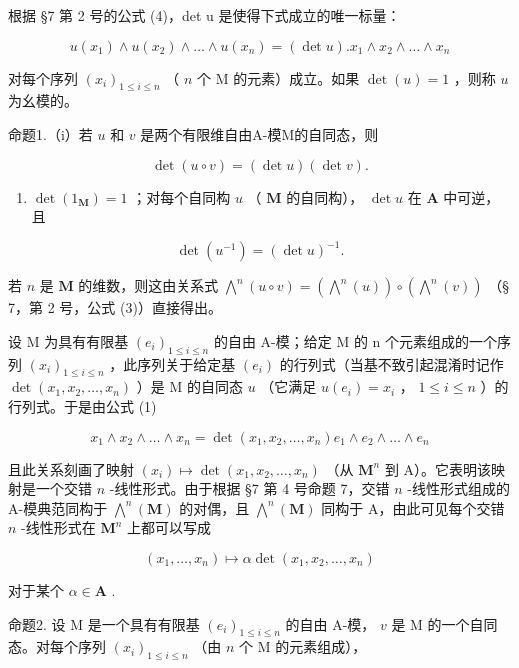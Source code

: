 根据 §7 第 2 号的公式 (4)，det u 是使得下式成立的唯一标量：

\[
u \left(x _ {1}\right) \wedge u \left(x _ {2}\right) \wedge \dots \wedge u \left(x _ {n}\right) = (\det u). x _ {1} \wedge x _ {2} \wedge \dots \wedge x _ {n}\tag{1}
\]

对每个序列 \((x_{i})_{1\leqslant i\leqslant n}\) （ \(n\) 个 M 的元素）成立。如果 \(\det (u) = 1\) ，则称 \(u\) 为幺模的。

命题1.（i）若 \(u\) 和 \(v\) 是两个有限维自由A-模M的自同态，则

\[
\det (u \circ v) = (\det u) (\det v).\tag{2}
\]

\begin{enumerate}
\def\labelenumi{(\roman{enumi})}
\setcounter{enumi}{1}
\tightlist
\item
  \(\operatorname{det}(1_{\mathbf{M}}) = 1\) ；对每个自同构 \(u\) （ \(\mathbf{M}\) 的自同构）， \(\operatorname{det} u\) 在 \(\mathbf{A}\) 中可逆，且
\end{enumerate}

\[
\det (u ^ {- 1}) = (\det u) ^ {- 1}.\tag{3}
\]

若 \(n\) 是 \(\mathbf{M}\) 的维数，则这由关系式 \(\bigwedge^{n}(u \circ v) = (\bigwedge^{n}(u)) \circ (\bigwedge^{n}(v))\) （§ 7，第 2 号，公式 (3)）直接得出。

设 M 为具有有限基 \((e_{i})_{1\leqslant i\leqslant n}\) 的自由 A-模；给定 M 的 n 个元素组成的一个序列 \((x_{i})_{1\leqslant i\leqslant n}\) ，此序列关于给定基 \((e_i)\) 的行列式（当基不致引起混淆时记作 \(\det(x_1, x_2, \ldots, x_n)\) ）是 M 的自同态 \(u\) （它满足 \(u(e_i) = x_i\) ， \(1 \leqslant i \leqslant n\) ）的行列式。于是由公式 (1)

\[
x _ {1} \wedge x _ {2} \wedge \dots \wedge x _ {n} = \det (x _ {1}, x _ {2}, \dots , x _ {n}) e _ {1} \wedge e _ {2} \wedge \dots \wedge e _ {n}\tag{4}
\]

且此关系刻画了映射 \((x_{i})\mapsto\det(x_{1},x_{2},\ldots,x_{n})\) （从 \(\mathbf{M}^{n}\) 到 A）。它表明该映射是一个交错 \(n\) -线性形式。由于根据 §7 第 4 号命题 7，交错 \(n\) -线性形式组成的 A-模典范同构于 \(\bigwedge^{n}(\mathbf{M})\) 的对偶，且 \(\bigwedge^{n}(\mathbf{M})\) 同构于 A，由此可见每个交错 \(n\) -线性形式在 \(\mathbf{M}^{n}\) 上都可以写成

\[
(x _ {1}, \dots , x _ {n}) \mapsto \alpha \det (x _ {1}, x _ {2}, \dots , x _ {n})
\]

对于某个 \(\alpha \in \mathbf{A}\) .

命题2. 设 M 是一个具有有限基 \((e_i)_{1 \leqslant i \leqslant n}\) 的自由 A-模， \(v\) 是 M 的一个自同态。对每个序列 \((x_i)_{1 \leqslant i \leqslant n}\) （由 \(n\) 个 M 的元素组成），

